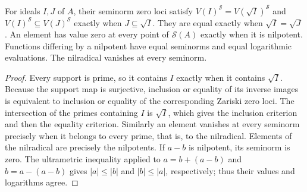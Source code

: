 \begin{lemma}\label{spectrum:radical-vanishing}
\leanok
{}
For ideals $I,J$ of $A$, their seminorm zero loci satisfy
$V(I)^\mathcal S=V(\sqrt I)^\mathcal S$ and
$V(I)^\mathcal S\subseteq V(J)^\mathcal S$ exactly when $J\subseteq\sqrt I$.
They are equal exactly when $\sqrt I=\sqrt J$.
An element has value zero at every point of $\mathcal S(A)$ exactly when it is nilpotent.
Functions differing by a nilpotent have equal seminorms and equal logarithmic evaluations.
The nilradical vanishes at every seminorm.
\end{lemma}
\begin{proof}
Every support is prime, so it contains $I$ exactly when it contains $\sqrt I$.
Because the support map is surjective, inclusion or equality of its inverse images
is equivalent to inclusion or equality of the corresponding Zariski zero loci.
The intersection of the primes containing $I$ is $\sqrt I$, which gives the
inclusion criterion and then the equality criterion. Similarly an element vanishes
at every seminorm precisely when it belongs to every prime, that is, to the
nilradical. Elements of the nilradical are precisely the nilpotents.
If $a-b$ is nilpotent, its seminorm is zero. The ultrametric inequality applied
to $a=b+(a-b)$ and $b=a-(a-b)$ gives $|a|\le|b|$ and $|b|\le|a|$,
respectively; thus their values and logarithms agree.
\end{proof}

